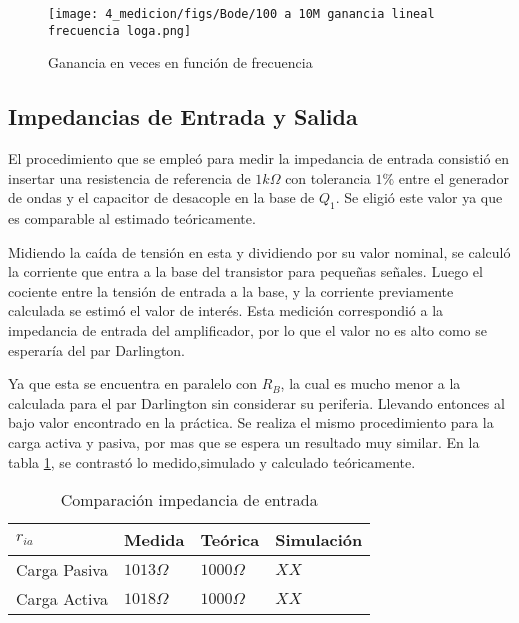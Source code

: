 \begin{figure}
    \centering
    \texttt{[image: 4\_medicion/figs/Bode/100 a 10M ganancia lineal frecuencia loga.png]}
    \caption{Ganancia en veces en función de frecuencia}\label{fig:ganancia veces funcion frecuencia medido}
\end{figure}



\subsection{Impedancias de Entrada y Salida}

El procedimiento que se empleó para medir la impedancia de entrada consistió en insertar una resistencia de referencia de $1 k\Omega$ con tolerancia $1\%$ entre el generador de ondas y el capacitor de desacople en la base de $Q_1$. Se eligió este valor ya que es comparable al estimado teóricamente.

Midiendo la caída de tensión en esta y dividiendo por su valor nominal, se calculó la corriente que entra a la base del transistor para pequeñas señales. Luego el cociente entre la tensión de entrada a la base, y la corriente previamente calculada se estimó el valor de interés. Esta medición correspondió a la impedancia de entrada del amplificador, por lo que el valor no es alto como se esperaría del par Darlington.

Ya que esta se encuentra en paralelo con $R_B$, la cual es mucho menor a la calculada para el par Darlington sin considerar su periferia. Llevando entonces al bajo valor encontrado en la práctica.
Se realiza el mismo procedimiento para la carga activa y pasiva, por mas que se espera un resultado muy similar. En la tabla \ref{table:Ri comp}, se contrastó lo medido,simulado y calculado teóricamente.

\begin{table}[ht]
    \centering
    \begin{tabular}{|l|l|l|l|}
    \hline
    $r_{ia}$     & Medida       & Teórica         & Simulación \\ \hline
    Carga Pasiva & $1013\Omega$ & $1000\Omega $   &  $XX $          \\ \hline
    Carga Activa & $1018\Omega$ & $1000\Omega $  &  $XX $          \\ \hline
    \end{tabular}
    \caption{Comparación impedancia de entrada}\label{table:Ri comp}
\end{table}

